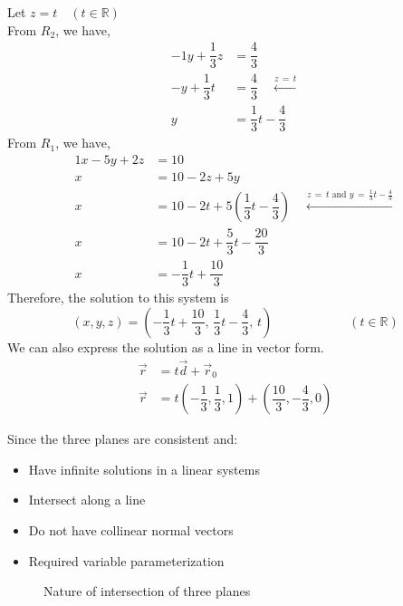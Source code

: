 \documentclass[12pt]{book}
\begin{document}
\begin{enumerate}
Let $z = t \quad (t \in \mathbb{R})$\\

From $R_2$, we have,
\begingroup
\addtolength{\jot}{0.5em}
\begin{align}
    -1y + \dfrac{1}{3}z &= \dfrac{4}{3}\\
    -y + \dfrac{1}{3}t &= \dfrac{4}{3} \quad \xleftarrow[]{z\,=\, t}\\
    y &= \dfrac{1}{3}t-\dfrac{4}{3}
\end{align}
\endgroup
From $R_1$, we have,
\begingroup
\addtolength{\jot}{0.5em}
\begin{align}
    1x -5y + 2z &= 10 \\
    x &= 10 - 2z + 5y \\
    x &= 10 - 2t + 5\left(\dfrac{1}{3}t-\dfrac{4}{3}\right) \quad \xleftarrow[]{z \, = \, t \text{ and } y \, = \, \frac{1}{3}t-\frac{4}{3}}\\
    x &= 10 -2t + \dfrac{5}{3}t - \dfrac{20}{3} \\
    x &= -\dfrac{1}{3}t + \dfrac{10}{3}
\end{align}
\endgroup
Therefore, the solution to this system is
$$(x,y,z) = \left(-\dfrac{1}{3}t + \dfrac{10}{3},\, \dfrac{1}{3}t-\dfrac{4}{3},\, t\right) \qquad \qquad \qquad (t \in \mathbb{R})$$
We can also express the solution as a line in vector form.
\begin{align}
    \vec{r} &= t\vec{d} + \vec{r}_0 \\
    \vec{r} &= t\left(-\dfrac{1}{3}, \dfrac{1}{3}, 1\right) + \left(\dfrac{10}{3},-\dfrac{4}{3},0\right)
\end{align}

Since the three planes are consistent and:

\begin{minipage}{0.5\textwidth}
    \begin{itemize}
        \item Have infinite solutions in a linear systems
        \item Intersect along a line
        \item Do not have collinear normal vectors
        \item Required variable parameterization
    \end{itemize}
\end{minipage}
\begin{minipage}{0.5\textwidth}
    \begin{figure}[H]
    \caption{Nature of intersection of three planes}
    \end{figure} 
\end{minipage}\\\\


\end{enumerate}
\end{document}

